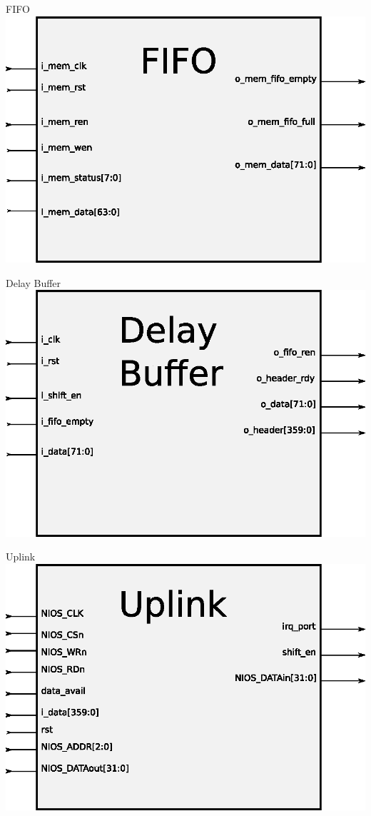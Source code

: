 \documentclass[xcolor=dvipsnames]{beamer}
\begin{document}
\begin{frame}{FIFO}
\center 
\includegraphics[scale=0.60]{figures/bloqfifo.eps}
\end{frame}

\begin{frame}{Delay Buffer}
\center 
\includegraphics[scale=0.60]{figures/bloqdelaybuffer.eps}
\end{frame}

\begin{frame}{Uplink}
\center 
\includegraphics[scale=0.60]{figures/bloquplink.eps}
\end{frame}
\end{document}
